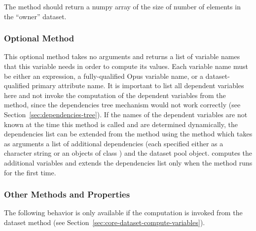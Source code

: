 The  method should return a numpy array of the size of number
of elements in the ``owner'' dataset. 

\subsubsection{Optional Method }
 
\label{sec:dependencies}
%
This optional method takes no arguments and returns a list of variable names
that this variable needs in order to compute its values. Each variable name
must be either an expression, a fully-qualified Opus variable name, or a dataset-qualified 
primary attribute name. It is important to list all dependent variables
here and not invoke the computation of the dependent variables from the
 method, since the dependencies tree mechanism would not
work correctly (see Section~\ref{sec:dependencies-tree}). If the names of the
dependent variables are not known at the time this method is called and are determined dynamically, the
dependencies list can be extended from the  method using the
 method  which takes as arguments
a list of additional dependencies (each specified either as a character string or an objects of class ) 
and the dataset pool object.  computes 
the additional variables and extends the
dependencies list only when the  method runs for the first
time.

\subsubsection{Other Methods and Properties}
%
The following behavior is only available if the computation is invoked from the dataset method  
 (see Section~\ref{sec:core-dataset-compute-variables}).

